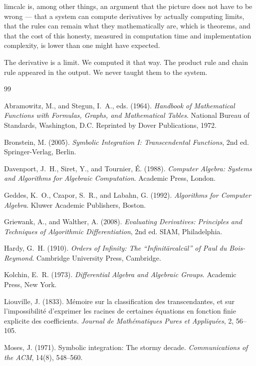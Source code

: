 \documentclass[12pt]{article}
\begin{document}
limcalc is, among other things, an argument that the picture does not
have to be wrong --- that a system can compute derivatives by actually
computing limits, that the rules can remain what they mathematically
are, which is theorems, and that the cost of this honesty, measured in
computation time and implementation complexity, is lower than one might
have expected.

The derivative is a limit. We computed it that way. The product rule and
chain rule appeared in the output. We never taught them to the system.




\begin{thebibliography}{99}

Abramowitz, M., and Stegun, I.~A., eds. (1964).
\emph{Handbook of Mathematical Functions with Formulas, Graphs, and Mathematical Tables}.
National Bureau of Standards, Washington, D.C. Reprinted by Dover Publications, 1972.

Bronstein, M. (2005).
\emph{Symbolic Integration I: Transcendental Functions}, 2nd ed.
Springer-Verlag, Berlin.

Davenport, J.~H., Siret, Y., and Tournier, \'{E}. (1988).
\emph{Computer Algebra: Systems and Algorithms for Algebraic Computation}.
Academic Press, London.

Geddes, K.~O., Czapor, S.~R., and Labahn, G. (1992).
\emph{Algorithms for Computer Algebra}.
Kluwer Academic Publishers, Boston.

Griewank, A., and Walther, A. (2008).
\emph{Evaluating Derivatives: Principles and Techniques of Algorithmic Differentiation}, 2nd ed.
SIAM, Philadelphia.

Hardy, G.~H. (1910).
\emph{Orders of Infinity: The ``Infinit\"{a}rcalc\"{u}l'' of Paul du Bois-Reymond}.
Cambridge University Press, Cambridge.

Kolchin, E.~R. (1973).
\emph{Differential Algebra and Algebraic Groups}.
Academic Press, New York.

Liouville, J. (1833).
M\'{e}moire sur la classification des transcendantes, et sur l'impossibilit\'{e} d'exprimer les racines de certaines \'{e}quations en fonction finie explicite des coefficients.
\emph{Journal de Math\'{e}matiques Pures et Appliqu\'{e}es}, 2, 56--105.

Moses, J. (1971).
Symbolic integration: The stormy decade.
\emph{Communications of the ACM}, 14(8), 548--560.


\end{thebibliography}
\end{document}
